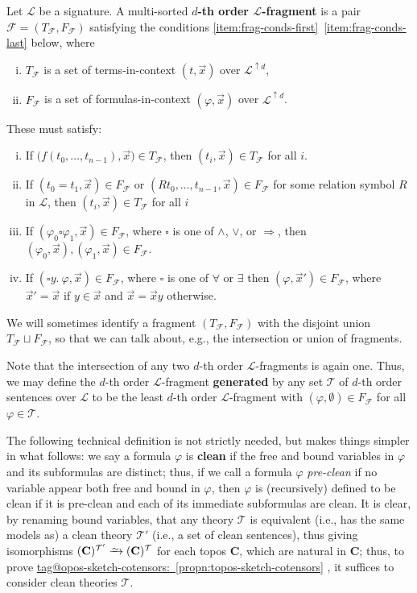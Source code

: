 \documentclass{amsart}
\makeatletter
\newcommand\bC{\mathbf{C}}
\newcommand\cF{\mathcal{F}}
\newcommand\cL{\mathcal{L}}
\newcommand\cT{\mathcal{T}}
\newcommand\defword[1]{{\boldmath \textbf{#1}}}
\newcommand\pbig[1]{\big({#1}\big)}
\renewcommand\phi{\varphi}
\newcommand\toi{\xrightarrow{\raisebox{-2.5pt}[0pt][0pt]{\ensuremath{\scriptstyle{\sim}}}}}
\newcommand\To{\Rightarrow}
\newcommand\up{\uparrow}
\newcommand\vek[1]{{\vec{#1}}}
\newcommand\vx{\vek{x}}
\newcommand\tagword[1]{\csname tag@#1\endcsname}
\def\label@tag#1:#2\@nil{#1}
\newcommand\labeltag[1]{\label@tag#1:\@nil}
\newcommand\jref[1]{%
  \texorpdfstring%
    {\hyperref[#1]{\tagword{\labeltag{#1}}~\ref*{#1}}}%
    {\tagword{\labeltag{#1}}~\ref*{#1}}%
}
\theoremstyle{definition}
\theoremstyle{remark}
\theoremstyle{plainwithref}
\makeatother
\begin{document}
\begin{defn}
  Let \( \cL \) be a signature.
  A multi-sorted \defword{\( d \)-th order \( \cL \)-fragment} is a pair \( \cF = (T_\cF, F_\cF) \) satisfying the conditions \ref{item:frag-conds-first}~\ref{item:frag-conds-last} below, where
  \begin{enumerate}[(i)]
  \item \( T_\cF \) is a set of terms-in-context \( (t, \vx) \) over \( \cL^{\up d} \),
  \item \( F_\cF \) is a set of formulas-in-context \( (\phi, \vx) \) over \( \cL^{\up d} \).
  \end{enumerate}
  These must satisfy:
  \begin{enumerate}[(i), resume]
  \item \label{item:frag-conds-first} If \( \pbig{f(t_0,\ldots,t_{n-1}), \vx} \in T_\cF \), then \( (t_i, \vx) \in T_\cF \) for all \( i \).
  \item If \( (t_0 = t_1, \vx) \in F_\cF \) or \( (R t_0,\ldots,t_{n-1}, \vx) \in F_\cF \) for some relation symbol \( R \) in \( \cL \), then \( (t_i, \vx) \in T_\cF \) for all \( i \)
  \item If \( (\phi_0 \square \phi_1, \vx) \in F_\cF \), where \( \square \) is one of \( \wedge \), \( \vee \), or \( \To \), then \( (\phi_0, \vx), (\phi_1, \vx) \in F_\cF \).
  \item \label{item:frag-conds-last} If \( (\square y.\ \phi, \vx) \in F_\cF \), where \( \square \) is one of \( \forall \) or \( \exists \) then \( (\phi, \vx') \in F_\cF \), where \( \vx' = \vx \) if \( y \in \vx \) and \( \vx = \vx y \) otherwise.
  \end{enumerate}

  We will sometimes identify a fragment \( (T_\cF, F_\cF) \) with the disjoint union \( T_\cF \sqcup F_\cF \), so that we can talk about, e.g., the intersection or union of fragments.

  Note that the intersection of any two \( d \)-th order \( \cL \)-fragments is again one.
  Thus, we may define the \( d \)-th order \( \cL \)-fragment \defword{generated} by any set \( \cT \) of \( d \)-th order sentences over \( \cL \) to be the least \( d \)-th order \( \cL \)-fragment with \( (\phi, \emptyset) \in F_\cF \) for all \( \phi \in \cT \).

  The following technical definition is not strictly needed, but makes things simpler in what follows: we say a formula \( \phi \) is \defword{clean} if the free and bound variables in \( \phi \) and its subformulas are distinct; thus, if we call a formula \( \phi \) \emph{pre-clean} if no variable appear both free and bound in \( \phi \), then \( \phi \) is (recursively) defined to be clean if it is pre-clean and each of its immediate subformulas are clean.
  It is clear, by renaming bound variables, that any theory \( \cT \) is equivalent (i.e., has the same models as) a clean theory \( \cT' \) (i.e., a set of clean sentences), thus giving isomorphisms \( (\bC)^{\cT'} \toi (\bC)^{\cT} \) for each topos \( \bC \), which are natural in \( \bC \); thus, to prove \jref{propn:topos-sketch-cotensors}, it suffices to consider clean theories \( \cT \).


\end{defn}
\end{document}
